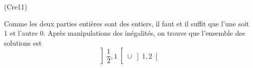 \begin{tiny}(Cre11)\end{tiny} Comme les deux parties entières sont des entiers, il faut et il suffit que l'une soit $1$ et l'autre $0$. Après manipulations des inégalités, on trouve que l'ensemble des solutions est
\begin{displaymath}
 \left]\frac{1}{2},1 \right[ \cup \left]1,2 \right[
\end{displaymath}
 